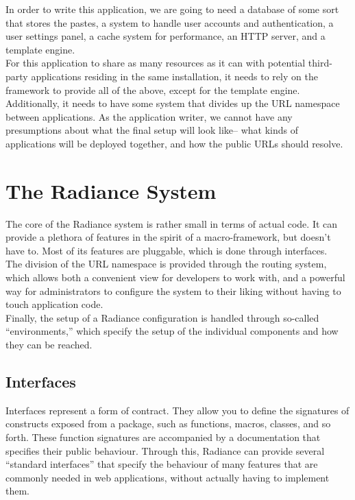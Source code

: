 \documentclass{sig-alternate}
\begin{document}
In order to write this application, we are going to need a database of some sort that stores the pastes, a system to handle user accounts and authentication, a user settings panel, a cache system for performance, an HTTP server, and a template engine. \\

For this application to share as many resources as it can with potential third-party applications residing in the same installation, it needs to rely on the framework to provide all of the above, except for the template engine. Additionally, it needs to have some system that divides up the URL namespace between applications. As the application writer, we cannot have any presumptions about what the final setup will look like-- what kinds of applications will be deployed together, and how the public URLs should resolve.

\section{The Radiance System}
The core of the Radiance system is rather small in terms of actual code. It can provide a plethora of features in the spirit of a macro-framework, but doesn't have to. Most of its features are pluggable, which is done through interfaces. \\

The division of the URL namespace is provided through the routing system, which allows both a convenient view for developers to work with, and a powerful way for administrators to configure the system to their liking without having to touch application code. \\

Finally, the setup of a Radiance configuration is handled through so-called ``environments,'' which specify the setup of the individual components and how they can be reached.

\subsection{Interfaces}
Interfaces represent a form of contract. They allow you to define the signatures of constructs exposed from a package, such as functions, macros, classes, and so forth. These function signatures are accompanied by a documentation that specifies their public behaviour. Through this, Radiance can provide several ``standard interfaces'' that specify the behaviour of many features that are commonly needed in web applications, without actually having to implement them. \\
\end{document}
